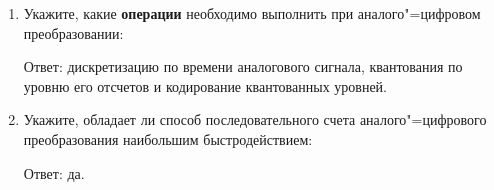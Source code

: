 \documentclass[spec, och, labwork]{shiza}
\begin{document}
\begin{enumerate}
    \item
        Укажите, какие \textbf{операции} необходимо выполнить при
        аналого"=цифровом преобразовании:
    
        Ответ: дискретизацию по времени аналогового сигнала, квантования по уровню его
        отсчетов и кодирование квантованных уровней.

    \item
        Укажите, обладает ли способ последовательного счета
        аналого"=цифрового преобразования наибольшим быстродействием:
    
        Ответ: да.
\end{enumerate}
\end{document}
